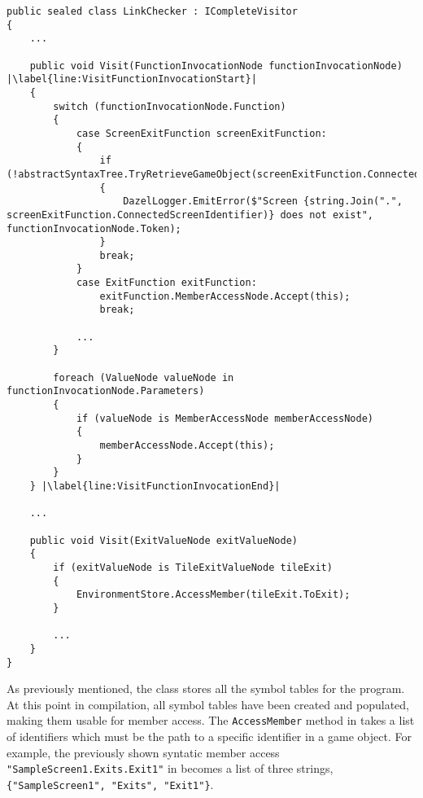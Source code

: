 \begin{lstlisting}[language=CSharp, caption={The \textbf{LinkChecker} class.}, label={lst:LinkerClass},escapechar=|]
public sealed class LinkChecker : ICompleteVisitor
{
	... 

	public void Visit(FunctionInvocationNode functionInvocationNode) |\label{line:VisitFunctionInvocationStart}|
	{
		switch (functionInvocationNode.Function) 
		{
			case ScreenExitFunction screenExitFunction:
			{
				if (!abstractSyntaxTree.TryRetrieveGameObject(screenExitFunction.ConnectedScreenIdentifier))
				{
					DazelLogger.EmitError($"Screen {string.Join(".", screenExitFunction.ConnectedScreenIdentifier)} does not exist", functionInvocationNode.Token);
				}
				break;
			}
			case ExitFunction exitFunction:
				exitFunction.MemberAccessNode.Accept(this);
				break;
			
			...
		}

		foreach (ValueNode valueNode in functionInvocationNode.Parameters)
		{
			if (valueNode is MemberAccessNode memberAccessNode)
			{
				memberAccessNode.Accept(this);
			}
		}
	} |\label{line:VisitFunctionInvocationEnd}|

	...

	public void Visit(ExitValueNode exitValueNode)
	{
		if (exitValueNode is TileExitValueNode tileExit)
		{
			EnvironmentStore.AccessMember(tileExit.ToExit);
		} 

		...
	}	
}
\end{lstlisting}

As previously mentioned, the \abstractsemanticclass{} class stores all the symbol tables for the program. 
At this point in compilation, all symbol tables have been created and populated, making them usable for member access.
The \texttt{AccessMember} method in  takes a list of identifiers which must be the path to a specific identifier in a game object.
For example, the previously shown syntatic member access \texttt{"SampleScreen1.Exits.Exit1"} in  becomes a list of three strings, 
\texttt{\{"SampleScreen1", "Exits", "Exit1"\}}.

